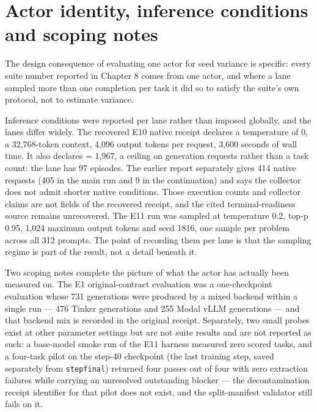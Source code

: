\documentclass[12pt,a4paper]{report}
\DeclareRobustCommand{\longtok}[1]{\texttt{\seqsplit{#1}}}
\begin{document}
\section{Actor identity, inference conditions and scoping
notes}\label{actor-identity-inference-conditions-and-scoping-notes}

The design consequence of evaluating one actor for seed variance is
specific: every suite number reported in Chapter 8 comes from one actor,
and where a lane sampled more than one completion per task it did so to
satisfy the suite's own protocol, not to estimate variance.

Inference conditions were reported per lane rather than imposed
globally, and the lanes differ widely. The recovered E10 native receipt
declares a temperature of 0, a 32,768-token context, 4,096 output tokens
per request, 3,600 seconds of wall time. It also declares
\longtok{max\_\allowbreak{}generation\_\allowbreak{}requests} = 1,967, a ceiling on generation
requests rather than a task count: the lane has 97 episodes. The earlier
report separately gives 414 native requests (405 in the main run and 9
in the continuation) and says the collector does not admit shorter
native conditions. Those execution counts and collector claims are not
fields of the recovered receipt, and the cited terminal-readiness source
remains unrecovered. The E11 run was sampled at temperature 0.2, top-p
0.95, 1,024 maximum output tokens and seed 1816, one sample per problem
across all 312 prompts. The point of recording them per lane is that the
sampling regime is part of the result, not a detail beneath it.

Two scoping notes complete the picture of what the actor has actually
been measured on. The E1 original-contract evaluation was a
one-checkpoint evaluation whose 731 generations were produced by a mixed
backend within a single run --- 476 Tinker generations and 255 Modal
vLLM generations --- and that backend mix is recorded in the original
receipt. Separately, two small probes exist at other parameter settings
but are not suite results and are not reported as such: a base-model
smoke run of the E11 harness measured zero scored tasks, and a four-task
pilot on the step-40 checkpoint (the last training step, saved
separately from \texttt{stepfinal}) returned four passes out of four
with zero extraction failures while carrying an unresolved outstanding
blocker --- the decontamination receipt identifier for that pilot does
not exist, and the split-manifest validator still fails on it.
\end{document}
